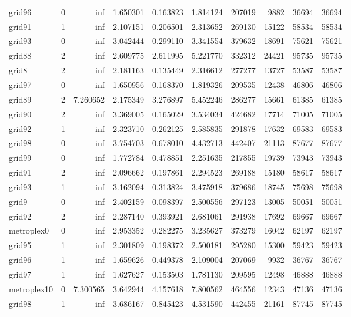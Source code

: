 \documentclass[../../../thesis.tex]{subfiles}
\begin{document}
\begin{longtable}{|l|r|r|r|r|r|r|r|r|r|}
grid96 & 0 & inf & 1.650301 & 0.163823 & 1.814124 & 207019 & 9882 & 36694 & 36694 \\
grid91 & 1 & inf & 2.107151 & 0.206501 & 2.313652 & 269130 & 15122 & 58534 & 58534 \\
grid93 & 0 & inf & 3.042444 & 0.299110 & 3.341554 & 379632 & 18691 & 75621 & 75621 \\
grid88 & 2 & inf & 2.609775 & 2.611995 & 5.221770 & 332312 & 24421 & 95735 & 95735 \\
grid8 & 2 & inf & 2.181163 & 0.135449 & 2.316612 & 277277 & 13727 & 53587 & 53587 \\
grid97 & 0 & inf & 1.650956 & 0.168370 & 1.819326 & 209535 & 12438 & 46806 & 46806 \\
grid89 & 2 & 7.260652 & 2.175349 & 3.276897 & 5.452246 & 286277 & 15661 & 61385 & 61385 \\
grid90 & 2 & inf & 3.369005 & 0.165029 & 3.534034 & 424682 & 17714 & 71005 & 71005 \\
grid92 & 1 & inf & 2.323710 & 0.262125 & 2.585835 & 291878 & 17632 & 69583 & 69583 \\
grid98 & 0 & inf & 3.754703 & 0.678010 & 4.432713 & 442407 & 21113 & 87677 & 87677 \\
grid99 & 0 & inf & 1.772784 & 0.478851 & 2.251635 & 217855 & 19739 & 73943 & 73943 \\
grid91 & 2 & inf & 2.096662 & 0.197861 & 2.294523 & 269188 & 15180 & 58617 & 58617 \\
grid93 & 1 & inf & 3.162094 & 0.313824 & 3.475918 & 379686 & 18745 & 75698 & 75698 \\
grid9 & 0 & inf & 2.402159 & 0.098397 & 2.500556 & 297123 & 13005 & 50051 & 50051 \\
grid92 & 2 & inf & 2.287140 & 0.393921 & 2.681061 & 291938 & 17692 & 69667 & 69667 \\
metroplex0 & 0 & inf & 2.953352 & 0.282275 & 3.235627 & 373279 & 16042 & 62197 & 62197 \\
grid95 & 1 & inf & 2.301809 & 0.198372 & 2.500181 & 295280 & 15300 & 59423 & 59423 \\
grid96 & 1 & inf & 1.659626 & 0.449378 & 2.109004 & 207069 & 9932 & 36767 & 36767 \\
grid97 & 1 & inf & 1.627627 & 0.153503 & 1.781130 & 209595 & 12498 & 46888 & 46888 \\
metroplex10 & 0 & 7.300565 & 3.642944 & 4.157618 & 7.800562 & 464556 & 12343 & 47136 & 47136 \\
grid98 & 1 & inf & 3.686167 & 0.845423 & 4.531590 & 442455 & 21161 & 87745 & 87745 \\

\end{longtable}
\end{document}
